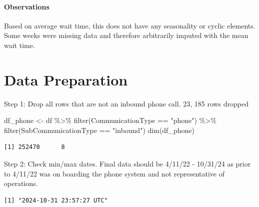\documentclass[
  letterpaper,
  DIV=11,
  numbers=noendperiod]{scrartcl}
\let\oldparagraph\paragraph
\renewcommand{\paragraph}[1]{\oldparagraph{#1}\mbox{}}
\newenvironment{Shaded}{\begin{snugshade}}{\end{snugshade}}
\newcommand{\FunctionTok}[1]{\textcolor[rgb]{0.28,0.35,0.67}{#1}}
\newcommand{\NormalTok}[1]{\textcolor[rgb]{0.00,0.23,0.31}{#1}}
\newcommand{\OtherTok}[1]{\textcolor[rgb]{0.00,0.23,0.31}{#1}}
\newcommand{\SpecialCharTok}[1]{\textcolor[rgb]{0.37,0.37,0.37}{#1}}
\newcommand{\StringTok}[1]{\textcolor[rgb]{0.13,0.47,0.30}{#1}}
\begin{document}
\paragraph{Observations}\label{observations-9}

Based on average wait time, this does not have any seasonality or cyclic
elements. Some weeks were missing data and therefore arbitrarily imputed
with the mean wait time.

\section{Data Preparation}\label{data-preparation}

Step 1: Drop all rows that are not an inbound phone call. 23, 185 rows
dropped

\begin{Shaded}
\begin{Highlighting}[]
\NormalTok{df\_phone }\OtherTok{\textless{}{-}}\NormalTok{ df }\SpecialCharTok{\%\textgreater{}\%}
  \FunctionTok{filter}\NormalTok{(CommunicationType }\SpecialCharTok{==} \StringTok{"phone"}\NormalTok{) }\SpecialCharTok{\%\textgreater{}\%}
  \FunctionTok{filter}\NormalTok{(SubCommunicationType }\SpecialCharTok{==} \StringTok{"inbound"}\NormalTok{)}
  \FunctionTok{dim}\NormalTok{(df\_phone)}
\end{Highlighting}
\end{Shaded}

\begin{verbatim}
[1] 252470      8
\end{verbatim}

Step 2: Check min/max dates. Final data should be 4/11/22 - 10/31/24 as
prior to 4/11/22 was on boarding the phone system and not representative
of operations.

\begin{Shaded}
\end{Shaded}

\begin{verbatim}
[1] "2024-10-31 23:57:27 UTC"
\end{verbatim}
\end{document}

